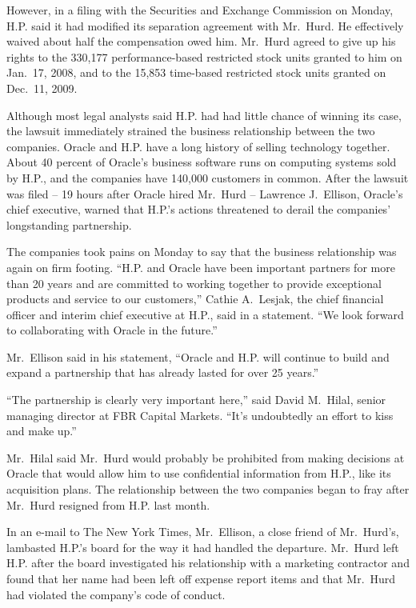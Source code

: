 ﻿\documentclass[12pt]{article}
\begin{document}
However, in a filing with the Securities and Exchange Commission on Monday, H.P. said it had
modified its separation agreement with Mr.~Hurd. He effectively waived about half the compensation
owed him. Mr.~Hurd agreed to give up his rights to the 330,177 performance-based restricted stock
units granted to him on Jan.~17, 2008, and to the 15,853 time-based restricted stock units granted
on Dec.~11, 2009.

Although most legal analysts said H.P. had had little chance of winning its case, the lawsuit
immediately strained the business relationship between the two companies. Oracle and H.P. have a
long history of selling technology together. About 40 percent of Oracle's business software runs on
computing systems sold by H.P., and the companies have 140,000 customers in common. After the
lawsuit was filed -- 19 hours after Oracle hired Mr.~Hurd -- Lawrence J.~Ellison, Oracle's chief
executive, warned that H.P.'s actions threatened to derail the companies' longstanding partnership.

The companies took pains on Monday to say that the business relationship was again on firm footing.
``H.P. and Oracle have been important partners for more than 20 years and are committed to working
together to provide exceptional products and service to our customers,'' Cathie A.~Lesjak, the chief
financial officer and interim chief executive at H.P., said in a statement. ``We look forward to
collaborating with Oracle in the future.''

Mr.~Ellison said in his statement, ``Oracle and H.P. will continue to build and expand a partnership
that has already lasted for over 25 years.''

``The partnership is clearly very important here,'' said David M.~Hilal, senior managing director at
FBR Capital Markets. ``It's undoubtedly an effort to kiss and make up.''

Mr.~Hilal said Mr.~Hurd would probably be prohibited from making decisions at Oracle that would
allow him to use confidential information from H.P., like its acquisition plans. The relationship
between the two companies began to fray after Mr.~Hurd resigned from H.P. last month.

In an e-mail to The New York Times, Mr.~Ellison, a close friend of Mr.~Hurd's, lambasted H.P.'s
board for the way it had handled the departure. Mr.~Hurd left H.P. after the board investigated his
relationship with a marketing contractor and found that her name had been left off expense report
items and that Mr.~Hurd had violated the company's code of conduct.
\end{document}
